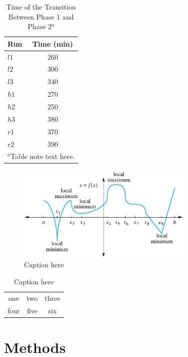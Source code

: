 %
%
\begin{table}
\caption{Time of the Transition Between Phase 1 and Phase 2$^{a}$}
\centering
\begin{tabular}{l c}
\hline
 Run  & Time (min)  \\
\hline
  $l1$  & 260   \\
  $l2$  & 300   \\
  $l3$  & 340   \\
  $h1$  & 270   \\
  $h2$  & 250   \\
  $h3$  & 380   \\
  $r1$  & 370   \\
  $r2$  & 390   \\
\hline
\multicolumn{2}{l}{$^{a}$Table note text here.}
\end{tabular}
\end{table}



%
 \begin{figure}
 \includegraphics[width=20pc]{figsamp}
 \caption{Caption here}
 \label{newfig}
 \end{figure}
%
 \begin{table}
 \caption{Caption here}
\label{tab:signif_gap_clos}
 \begin{tabular}{ccc}
one&two&three\\
four&five&six
 \end{tabular}
 \end{table}

\clearpage

\section{Methods}
\label{sec:meth}

